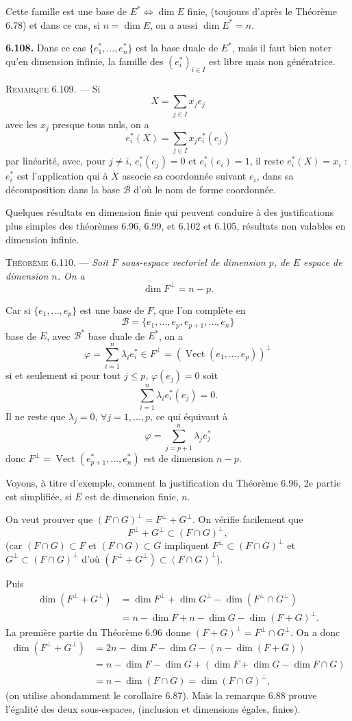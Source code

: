 Cette famille est une base de $E^*\Longleftrightarrow\dim E$ finie, (toujours d'après le Théorème 6.78) et dans ce cas, si $n=\dim E$, on a aussi $\dim E^*=n$.

\medskip\noindent\textbf{6.108.} Dans ce cas $\{e_1^*,\ldots,e_n^*\}$ est la base duale de $E^*$, mais il faut bien noter qu'en dimension infinie, la famille des $(e_i^*)_{i\in I}$ est libre mais non génératrice.

\medskip\noindent\textsc{Remarque 6.109.} --- Si
\[
X=\sum_{j\in I}x_j e_j
\]
avec les $x_j$ presque tous nuls, on a
\[
e_i^*(X)=\sum_{j\in I}x_j e_i^*(e_j)
\]
par linéarité, avec, pour $j\ne i$, $e_i^*(e_j)=0$ et $e_i^*(e_i)=1$, il reste $e_i^*(X)=x_i$ : $e_i^*$ est l'application qui à $X$ associe sa coordonnée suivant $e_i$, dans sa décomposition dans la base $\mathcal B$ d'où le nom de forme coordonnée.

Quelques résultats en dimension finie qui peuvent conduire à des justifications plus simples des théorèmes 6.96, 6.99, et 6.102 et 6.105, résultats non valables en dimension infinie.

\medskip\noindent\textsc{Théorème 6.110.} --- \emph{Soit $F$ sous-espace vectoriel de dimension $p$, de $E$ espace de dimension $n$. On a
\[
\dim F^\perp=n-p.
\]}

Car si $\{e_1,\ldots,e_p\}$ est une base de $F$, que l'on complète en
\[
\mathcal B=\{e_1,\ldots,e_p,e_{p+1},\ldots,e_n\}
\]
base de $E$, avec $\mathcal B^*$ base duale de $E^*$, on a
\[
\varphi=\sum_{i=1}^n\lambda_i e_i^*\in F^\perp=(\operatorname{Vect}(e_1,\ldots,e_p))^\perp
\]
si et seulement si pour tout $j\le p$, $\varphi(e_j)=0$ soit
\[
\sum_{i=1}^n\lambda_i e_i^*(e_j)=0.
\]
Il ne reste que $\lambda_j=0$, $\forall j=1,\ldots,p$, ce qui équivaut à
\[
\varphi=\sum_{j=p+1}^n\lambda_j e_j^*
\]
donc $F^\perp=\operatorname{Vect}(e_{p+1}^*,\ldots,e_n^*)$ est de dimension $n-p$. \bookend

Voyons, à titre d'exemple, comment la justification du Théorème 6.96, 2e partie est simplifiée, si $E$ est de dimension finie, $n$.

On veut prouver que $(F\cap G)^\perp=F^\perp+G^\perp$. On vérifie facilement que
\[
F^\perp+G^\perp\subset(F\cap G)^\perp,
\]
(car $(F\cap G)\subset F$ et $(F\cap G)\subset G$ impliquent $F^\perp\subset(F\cap G)^\perp$ et $G^\perp\subset(F\cap G)^\perp$ d'où $(F^\perp+G^\perp)\subset(F\cap G)^\perp$).

Puis
\[
\begin{aligned}
\dim(F^\perp+G^\perp)
&=\dim F^\perp+\dim G^\perp-\dim(F^\perp\cap G^\perp)\\
&=n-\dim F+n-\dim G-\dim(F+G)^\perp.
\end{aligned}
\]
La première partie du Théorème 6.96 donne $(F+G)^\perp=F^\perp\cap G^\perp$. On a donc
\[
\begin{aligned}
\dim(F^\perp+G^\perp)
&=2n-\dim F-\dim G-(n-\dim(F+G))\\
&=n-\dim F-\dim G+(\dim F+\dim G-\dim F\cap G)\\
&=n-\dim(F\cap G)=\dim(F\cap G)^\perp,
\end{aligned}
\]
(on utilise abondamment le corollaire 6.87). Mais la remarque 6.88 prouve l'égalité des deux sous-espaces, (inclusion et dimensions égales, finies). \bookend

